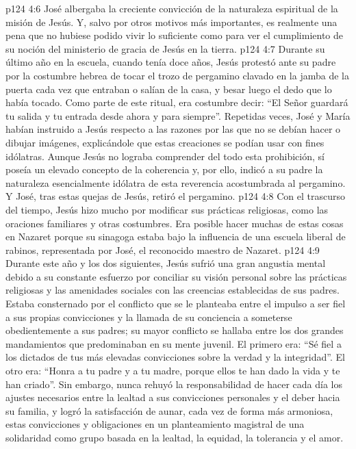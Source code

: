 \vs p124 4:6 José albergaba la creciente convicción de la naturaleza espiritual de la misión de Jesús. Y, salvo por otros motivos más importantes, es realmente una pena que no hubiese podido vivir lo suficiente como para ver el cumplimiento de su noción del ministerio de gracia de Jesús en la tierra.
\vs p124 4:7 \pc Durante su último año en la escuela, cuando tenía doce años, Jesús protestó ante su padre por la costumbre hebrea de tocar el trozo de pergamino clavado en la jamba de la puerta cada vez que entraban o salían de la casa, y besar luego el dedo que lo había tocado. Como parte de este ritual, era costumbre decir: “El Señor guardará tu salida y tu entrada desde ahora y para siempre”. Repetidas veces, José y María habían instruido a Jesús respecto a las razones por las que no se debían hacer o dibujar imágenes, explicándole que estas creaciones se podían usar con fines idólatras. Aunque Jesús no lograba comprender del todo esta prohibición, sí poseía un elevado concepto de la coherencia y, por ello, indicó a su padre la naturaleza esencialmente idólatra de esta reverencia acostumbrada al pergamino. Y José, tras estas quejas de Jesús, retiró el pergamino.
\vs p124 4:8 Con el trascurso del tiempo, Jesús hizo mucho por modificar sus prácticas religiosas, como las oraciones familiares y otras costumbres. Era posible hacer muchas de estas cosas en Nazaret porque su sinagoga estaba bajo la influencia de una escuela liberal de rabinos, representada por José, el reconocido maestro de Nazaret.
\vs p124 4:9 Durante este año y los dos siguientes, Jesús sufrió una gran angustia mental debido a su constante esfuerzo por conciliar su visión personal sobre las prácticas religiosas y las amenidades sociales con las creencias establecidas de sus padres. Estaba consternado por el conflicto que se le planteaba entre el impulso a ser fiel a sus propias convicciones y la llamada de su conciencia a someterse obedientemente a sus padres; su mayor conflicto se hallaba entre los dos grandes mandamientos que predominaban en su mente juvenil. El primero era: “Sé fiel a los dictados de tus más elevadas convicciones sobre la verdad y la integridad”. El otro era: “Honra a tu padre y a tu madre, porque ellos te han dado la vida y te han criado”. Sin embargo, nunca rehuyó la responsabilidad de hacer cada día los ajustes necesarios entre la lealtad a sus convicciones personales y el deber hacia su familia, y logró la satisfacción de aunar, cada vez de forma más armoniosa, estas convicciones y obligaciones en un planteamiento magistral de una solidaridad como grupo basada en la lealtad, la equidad, la tolerancia y el amor.
